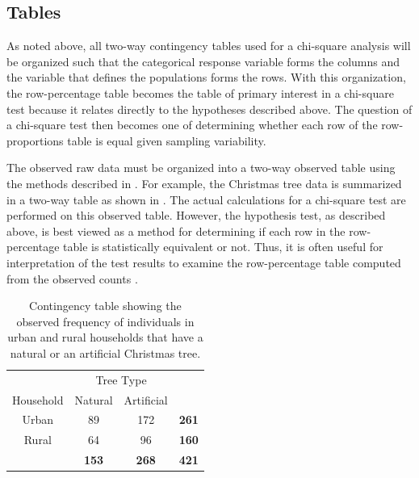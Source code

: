 \documentclass[10pt,openany]{book}\usepackage[]{graphicx}\usepackage[]{color}
\begin{document}
\subsection{Tables}
As noted above, all two-way contingency tables used for a chi-square analysis will be organized such that the categorical response variable forms the columns and the variable that defines the populations forms the rows.  With this organization, the row-percentage table becomes the table of primary interest in a chi-square test because it relates directly to the hypotheses described above.  The question of a chi-square test then becomes one of determining whether each row of the row-proportions table is equal given sampling variability.


The observed raw data must be organized into a two-way observed table using the methods described in .  For example, the Christmas tree data is summarized in a two-way table as shown in .  The actual calculations for a chi-square test are performed on this observed table.  However, the hypothesis test, as described above, is best viewed as a method for determining if each row in the row-percentage table is statistically equivalent or not.  Thus, it is often useful for interpretation of the test results to examine the row-percentage table computed from the observed counts .

\begin{table}[htbp]
  \centering
  \caption{Contingency table showing the observed frequency of individuals in urban and rural households that have a natural or an artificial Christmas tree.}\label{tab:ChiTreeObs}
    \begin{tabular}{c|c|c|c|}
      \multicolumn{1}{c}{} & \multicolumn{2}{c}{Tree Type} & \multicolumn{1}{c}{} \\
      \cline{2-3}
      Household & Natural & Artificial & \multicolumn{1}{c}{} \\
      \hline
      \multicolumn{1}{|c|}{Urban} & 89 & 172 & \textbf{261} \\
      \hline
      \multicolumn{1}{|c|}{Rural} & 64 & 96 & \textbf{160} \\
      \hline
       & \textbf{153} & \textbf{268} & \textbf{421} \\
      \cline{2-4}
    \end{tabular}
\end{table}
\end{document}
